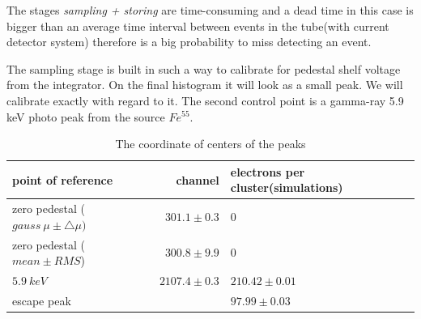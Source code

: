 \documentclass[12pt,a4paper]{article}
\begin{document}
	The stages {\it sampling + storing} are time-consuming and a dead time in this case is bigger than an average time interval between events in the tube(with current detector system) therefore is a big probability to miss detecting an event.
	
	The sampling stage is built in such a way to calibrate for pedestal shelf voltage from the integrator. On the final histogram it will look as a small peak. We will calibrate exactly with regard to it. The second control point is a gamma-ray 5.9 keV photo peak from the source $Fe^{55}$.
	
	
	
	
	
	
	
	\begin{table}[!h]
	\centering
	\begin{tabular}{|l|r|l|}
		\hline
		point of reference & channel & electrons per cluster(simulations)\\
		\hline
		zero pedestal ($gauss~\mu \pm \bigtriangleup \mu)$ & $301.1 \pm 0.3 $ & 0\\
		\hline
		zero pedestal ($mean \pm RMS$) & $300.8 \pm 9.9$ & 0 \\
		\hline
		$5.9~keV$ & $2107.4 \pm 0.3$ & $210.42 \pm 0.01$ \\ 
		\hline
		escape peak & & $97.99 \pm 0.03$ \\
		\hline
	\end{tabular}
	\caption{ The coordinate of centers of the peaks}	
	\end{table}
	
\end{document}
